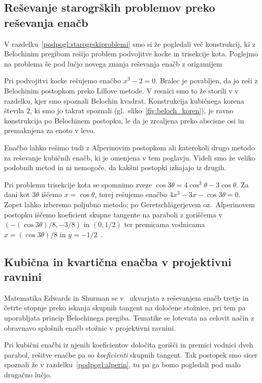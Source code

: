 \subsection{Reševanje starogrških problemov preko reševanja enačb}

V razdelku~\ref{podpogl:starogrskiproblemi} smo si že pogledali več konstrukcij, ki z Belochinim pregibom rešijo problem podvojitve kocke in trisekcije kota. Poglejmo na problema še pod lučjo novega znanja reševanja enačb z origamijem

Pri podvojitvi kocke rešujemo enačbo $x^3 - 2 = 0$. Bralec je povabljen, da jo reši z Belochinim postopkom preko Lillove metode. V resnici smo to že storili v v razdelku, kjer smo spoznali Belochin kvadrat. Konstrukcija kubičnega korena števila $2$, ki smo jo takrat spoznali (gl.\ sliko~\ref{fig:beloch_koren}), je ravno konstrukcija po Belochinem postopku, le da je zrcaljena preko abscisne osi in premaknjena za enoto v levo.

Enačbo lahko rešimo tudi z Alperinovim postopkom ali katerokoli drugo metodo za reševanje kubičnih enačb, ki je omenjena v tem poglavju. Videli smo že veliko podobnih metod in ni nemogoče, da kakšni postopki izhajajo iz drugih.

Pri problemu trisekcije kota se spomnimo zveze $\cos 3\theta = 4 \cos^3 \theta - 3 \cos \theta$. Za dani kot $3 \theta$ iščemo $x = \cos \theta$, torej rešujemo enačbo $4x^3-3x-\cos 3\theta=0$. Zopet lahko izberemo poljubno metodo; po Geretschlägerjevem oz.\ Alperinovem postopku iščemo koeficient skupne tangente na paraboli z goriščema v $(-(\cos 3 \theta) / 8, -3/8)$ in $(0, 1/2)$ ter premicama vodnicama $x = (\cos 3 \theta) / 8$ in $y = -1/2$~\cite[str.\ 370]{geret1995}.

\subsection{Kubična in kvartična enačba v projektivni ravnini}
\label{podpogl:afina_proj_enacbe}

Matematika Edwards in Shurman se v~\cite{edwards2001} ukvarjata z reševanjem enačb tretje in četrte stopnje preko iskanja skupnih tangent na določene stožnice, pri tem pa uporabljata princip Belochinega pregiba. Tematike se lotevata na celovit način z obravnavo splošnih enačb stožnic v projektivni ravnini.

Pri kubični enačbi iz njenih koeficientov določita gorišči in premici vodnici dveh parabol, rešitve enačbe pa so \emph{koeficienti} skupnih tangent. Tak postopek smo sicer spoznali že v razdelku~\ref{podpogl:alperin}, tu pa ga bomo pogledali pod malo drugačno lučjo.

